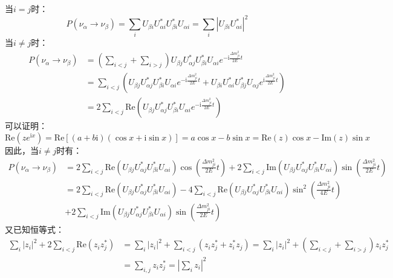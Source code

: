 \documentclass{article}
\newcommand{\ii}{\mathrm{i}}
\begin{document}
	当$i=j$时：
	\begin{equation*}
		P(\nu_\alpha\to\nu_\beta)=\sum_{i} U_{\beta i}U_{\alpha i}^*U_{\beta i}^*U_{\alpha i}=\sum_i\left|U_{\beta i}U_{\alpha i}^*\right|^2
	\end{equation*}
	当$i\ne j$时：
	\begin{equation*}
		\begin{aligned}
			P(\nu_\alpha\to\nu_\beta)&=\left(\sum_{i<j}+\sum_{i>j}\right)U_{\beta j}U_{\alpha j}^*U_{\beta i}^* U_{\alpha i}e^{-\ii \frac{\Delta m_{ji}^2}{2E} t}\\&=\sum_{i<j}\left(U_{\beta j}U_{\alpha j}^*U_{\beta i}^* U_{\alpha i}e^{-\ii \frac{\Delta m_{ji}^2}{2E} t}+U_{\beta i}U_{\alpha i}^*U_{\beta j}^*U_{\alpha j}e^{\ii\frac{\Delta m_{ji}^2}{2E}t}\right)\\
			&=2\sum_{i<j}\mathrm{Re}\left(U_{\beta j}U_{\alpha j}^*U_{\beta i}^* U_{\alpha i}e^{-\ii \frac{\Delta m_{ji}^2}{2E} t}\right)
		\end{aligned}
	\end{equation*}
	可以证明：
	\begin{equation*}
		\mathrm{Re}\left(ze^{\ii x}\right)=\mathrm{Re}\left[(a+b\ii)(\cos x+\ii\sin x)\right]=a\cos x-b\sin x=\mathrm{Re}(z)\cos x-\mathrm{Im}(z)\sin x
	\end{equation*}
	因此，当$i\ne j$时有：
	\begin{equation*}
		\begin{aligned}
			P(\nu_\alpha\to\nu_\beta)&=2\sum_{i<j}\mathrm{Re}\left(U_{\beta j}U_{\alpha j}^*U_{\beta i}^* U_{\alpha i}\right)\cos\left(\frac{\Delta m_{ji}^2}{2E}t\right)+2\sum_{i<j}\mathrm{Im}\left(U_{\beta j}U_{\alpha j}^*U_{\beta i}^* U_{\alpha i}\right)\sin\left(\frac{\Delta m_{ji}^2}{2E}t\right)\\
			&=2\sum_{i<j}\mathrm{Re}\left(U_{\beta j}U_{\alpha j}^*U_{\beta i}^* U_{\alpha i}\right)-4\sum_{i<j}\mathrm{Re}\left(U_{\beta j}U_{\alpha j}^*U_{\beta i}^* U_{\alpha i}\right)\sin^2\left(\frac{\Delta m_{ji}^2}{4E}t\right)\\
			&+2\sum_{i<j}\mathrm{Im}\left(U_{\beta j}U_{\alpha j}^*U_{\beta i}^* U_{\alpha i}\right)\sin\left(\frac{\Delta m_{ji}^2}{2E}t\right)
		\end{aligned}
	\end{equation*}
	又已知恒等式：
	\begin{equation*}
		\begin{aligned}
			\sum_i|z_i|^2+2\sum_{i<j}\mathrm{Re}(z_iz_j^*)&=\sum_{i}|z_i|^2+\sum_{i<j}(z_iz_j^*+z_i^*z_j)=\sum_i|z_i|^2+\left(\sum_{i<j}+\sum_{i>j}\right)z_iz_j^*\\&=\sum_{i,j}z_iz_j^*=\left|\sum_i z_i\right|^2
		\end{aligned}
	\end{equation*}
\end{document}
